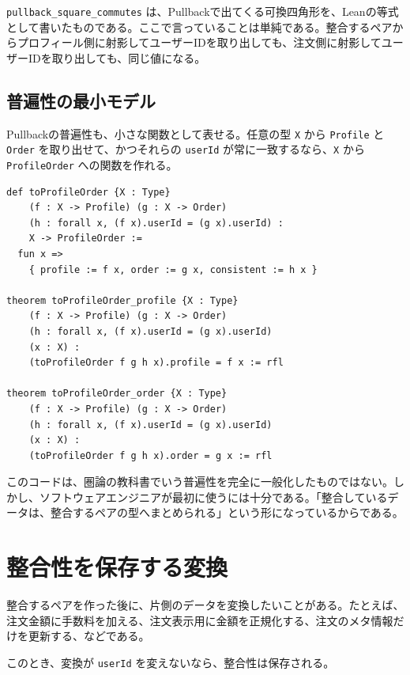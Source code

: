 \texttt{pullback\_square\_commutes} は、Pullbackで出てくる可換四角形を、Leanの等式として書いたものである。ここで言っていることは単純である。整合するペアからプロフィール側に射影してユーザーIDを取り出しても、注文側に射影してユーザーIDを取り出しても、同じ値になる。

\subsection{普遍性の最小モデル}

Pullbackの普遍性も、小さな関数として表せる。任意の型 \texttt{X} から \texttt{Profile} と \texttt{Order} を取り出せて、かつそれらの \texttt{userId} が常に一致するなら、\texttt{X} から \texttt{ProfileOrder} への関数を作れる。

\begin{listing}[htbp]
\begin{verbatim}
def toProfileOrder {X : Type}
    (f : X -> Profile) (g : X -> Order)
    (h : forall x, (f x).userId = (g x).userId) :
    X -> ProfileOrder :=
  fun x =>
    { profile := f x, order := g x, consistent := h x }

theorem toProfileOrder_profile {X : Type}
    (f : X -> Profile) (g : X -> Order)
    (h : forall x, (f x).userId = (g x).userId)
    (x : X) :
    (toProfileOrder f g h x).profile = f x := rfl

theorem toProfileOrder_order {X : Type}
    (f : X -> Profile) (g : X -> Order)
    (h : forall x, (f x).userId = (g x).userId)
    (x : X) :
    (toProfileOrder f g h x).order = g x := rfl
\end{verbatim}
\caption{任意の整合データからPullback的構造へ写す}
\label{lst:ch17-universal-map}
\end{listing}

このコードは、圏論の教科書でいう普遍性を完全に一般化したものではない。しかし、ソフトウェアエンジニアが最初に使うには十分である。「整合しているデータは、整合するペアの型へまとめられる」という形になっているからである。

\section{整合性を保存する変換}

整合するペアを作った後に、片側のデータを変換したいことがある。たとえば、注文金額に手数料を加える、注文表示用に金額を正規化する、注文のメタ情報だけを更新する、などである。

このとき、変換が \texttt{userId} を変えないなら、整合性は保存される。

